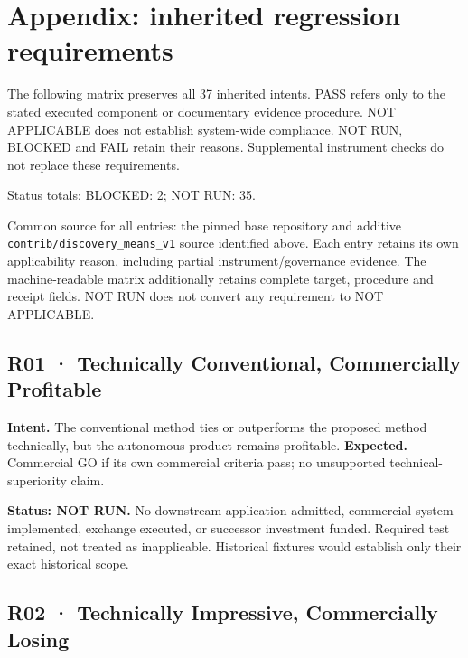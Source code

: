 \documentclass[10pt,letterpaper]{article}
\begin{document}
\hypertarget{appendix-inherited-regression-requirements}{%
\section{Appendix: inherited regression
requirements}\label{appendix-inherited-regression-requirements}}

The following matrix preserves all 37 inherited intents. PASS refers
only to the stated executed component or documentary evidence procedure.
NOT APPLICABLE does not establish system-wide compliance. NOT RUN,
BLOCKED and FAIL retain their reasons. Supplemental instrument checks do
not replace these requirements.

Status totals: BLOCKED: 2; NOT RUN: 35.

Common source for all entries: the pinned base repository and additive
\texttt{contrib/discovery\_means\_v1} source identified above. Each
entry retains its own applicability reason, including partial
instrument/governance evidence. The machine-readable matrix additionally
retains complete target, procedure and receipt fields. NOT RUN does not
convert any requirement to NOT APPLICABLE.

\hypertarget{r01-technically-conventional-commercially-profitable}{%
\subsection{R01 · Technically Conventional, Commercially
Profitable}\label{r01-technically-conventional-commercially-profitable}}

\textbf{Intent.} The conventional method ties or outperforms the
proposed method technically, but the autonomous product remains
profitable. \textbf{Expected.} Commercial GO if its own commercial
criteria pass; no unsupported technical-superiority claim.

\textbf{Status: NOT RUN.} No downstream application admitted, commercial
system implemented, exchange executed, or successor investment funded.
Required test retained, not treated as inapplicable. Historical fixtures
would establish only their exact historical scope.

\hypertarget{r02-technically-impressive-commercially-losing}{%
\subsection{R02 · Technically Impressive, Commercially
Losing}\label{r02-technically-impressive-commercially-losing}}
\end{document}
